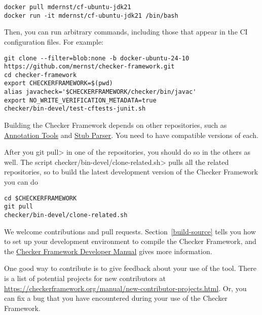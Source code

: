 \begin{Verbatim}
docker pull mdernst/cf-ubuntu-jdk21
docker run -it mdernst/cf-ubuntu-jdk21 /bin/bash
\end{Verbatim}

Then, you can run arbitrary commands, including those that appear in the
CI configuration files.  For example:

\begin{Verbatim}
git clone --filter=blob:none -b docker-ubuntu-24-10 https://github.com/mernst/checker-framework.git
cd checker-framework
export CHECKERFRAMEWORK=$(pwd)
alias javacheck='$CHECKERFRAMEWORK/checker/bin/javac'
export NO_WRITE_VERIFICATION_METADATA=true
checker/bin-devel/test-cftests-junit.sh
\end{Verbatim}



Building the Checker Framework depends on other repositories, such as
\href{https://github.com/typetools/annotation-tools/}{Annotation Tools} and
\href{https://github.com/typetools/stubparser/}{Stub Parser}.
You need to have compatible versions of each.

After you \<git pull> in one of the repositories, you should do so in the
others as well.  The script \<checker/bin-devel/clone-related.sh> pulls all the
related repositories, so to build the latest development version of the
Checker Framework you can do

\begin{Verbatim}
cd $CHECKERFRAMEWORK
git pull
checker/bin-devel/clone-related.sh
\end{Verbatim}



We welcome contributions and pull requests.  Section~\ref{build-source}
tells you how to set up your development environment to compile the Checker
Framework, and the
\href{https://checkerframework.org/manual/developer-manual.html}{Checker
  Framework Developer Manual} gives more information.

One good way to contribute is to give feedback about your use of the tool.
There is a list
of potential projects for new contributors at
\url{https://checkerframework.org/manual/new-contributor-projects.html}.
Or, you can fix a bug that
you have encountered during your use of the Checker Framework.



